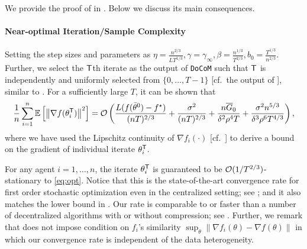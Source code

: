 \documentclass[10pt]{article} %
\theoremstyle{plain}
\theoremstyle{definition}
\theoremstyle{remark}
\newcommand{\aname}{{\tt DoCoM}}
\newcommand{\prm}{\theta}
\newcommand{\avgtheta}{\bar{\prm}}
\newcommand{\norm}[1]{\left\| #1 \right\|}
\newcommand{\InitG}{\overline{G}_0}
\begin{document}
We provide the proof of  in . Below we discuss its main consequences.

\paragraph{Near-optimal Iteration/Sample Complexity} 
Setting the step sizes and parameters as $\eta = \frac{ n^{2/3} }{ L T^{1/3} }, \gamma = \gamma_\infty, \beta = \frac{ n^{1/3} }{ T^{2/3} }, b_0 = \frac{ T^{1/3} }{ n^{2/3} }$. Further, we select the ${\sf T}$th iterate as the output of {\aname} such that ${\sf T}$ is independently and uniformly selected from $\{0,\ldots, T-1\}$ [cf.~the output of ], similar to \citep{ghadimi2013stochastic}. For a sufficiently large $T$, it can be shown that \vspace{-.1cm}
\begin{equation}
\frac{1}{n} \sum_{i=1}^n \mathbb{E} \left[ \norm{ \nabla f( \theta_i^{\sf T} )}^2 \right] = {\cal O} \left( \frac{L (f(\avgtheta^0) - f^\star)}{(nT)^{2/3}} + \frac{\sigma^2}{ (n T)^{2/3}} + \frac{n \InitG}{ \delta^2 \rho^4 T} + \frac{\sigma^2 n^{5/3}}{ \delta^3 \rho^6 T^{4/3}} \right) , \label{eq:grdFbound} 
\end{equation}
where we have used the Lipschitz continuity of $\nabla f_i(\cdot)$ [cf.~] to derive a bound on the gradient of individual iterate $\theta_i^{\sf T}$. 

For any agent $i=1,\ldots, n$, the iterate $\theta_i^{\sf T}$ is guaranteed to be ${\cal O}(1/T^{2/3})$-stationary to \eqref{eq:opt}. 
Notice that this is the state-of-the-art convergence rate for first order stochastic optimization even in the centralized setting; see \citep{cutkosky2019momentum, tran2021hybrid}; and it also matches the lower bound in \citep{arjevani2019lower}. Our rate is comparable to or faster than a number of decentralized algorithms with or without compression; see . Further, we remark that  does not impose condition on $f_i$'s similarity $\sup_{\theta} \| \nabla f_i(\theta) - \nabla f(\theta) \|$ in which our convergence rate is independent of the data heterogeneity. 
\end{document}
